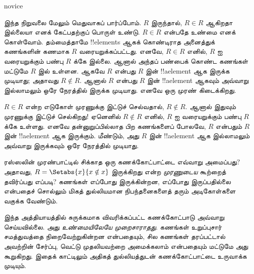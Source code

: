 \documentclass[../../../include/open-logic-section]{subfiles}
\begin{document}
\begin{tagblock}{novice}
\begin{explain}
இந்த நிறுவலை மேலும் மெதுவாகப் பார்ப்போம். $R$ இருந்தால்,
$R \in R$ ஆகிறதா இல்லையா எனக் கேட்பதற்குப் பொருள் உண்டு.
$R \in R$ என்பதே உண்மை எனக் கொள்வோம்.
தம்மைத்தாமே !!{element}s ஆகக் கொண்டிராத அனைத்துக் கணங்களின் கணமாக
$R$ வரையறுக்கப்பட்டது. எனவே, $R \in R$ எனில்,
$R$ ஐ வரையறுக்கும் பண்பு $R$ க்கே இல்லை.
ஆனால் அந்தப் பண்பைக் கொண்ட கணங்கள் மட்டுமே $R$ இல் உள்ளன.
ஆகவே $R$ என்பது $R$ இன் !!a{element} ஆக இருக்க முடியாது;
அதாவது $R \notin R$. ஆனால் $R$ என்பது $R$ இன் !!a{element} ஆகவும்
அவ்வாறு இல்லாமலும் ஒரே நேரத்தில் இருக்க முடியாது.
எனவே ஒரு முரண் கிடைக்கிறது.

$R \in R$ என்ற எடுகோள் முரணுக்கு இட்டுச் செல்வதால், $R \notin R$.
ஆனால் இதுவும் முரணுக்கு இட்டுச் செல்கிறது!
ஏனெனில் $R \notin R$ எனில், $R$ ஐ வரையறுக்கும் பண்பு $R$ க்கே உள்ளது.
எனவே தன்னுறுப்பில்லாத பிற கணங்களைப் போலவே, $R$ என்பதும் $R$ இன்
!!a{element} ஆக இருக்கும். மீண்டும், அது $R$ இன் !!a{element} ஆக இல்லாமலும்
அவ்வாறு இருக்கவும் ஒரே நேரத்தில் முடியாது.
\end{explain}
\end{tagblock}

\begin{digress}
ரஸ்ஸலின் முரண்பாட்டில் சிக்காத ஒரு கணக்கோட்பாட்டை எவ்வாறு அமைப்பது?
அதாவது, $R = \Setabs{x}{x \notin x}$ இருக்கிறது என்ற
\emph{முரணுடைய} கூற்றைத் தவிர்ப்பது எப்படி?
கணங்கள் எப்போது இருக்கின்றன, எப்போது இருப்பதில்லை என்பதைச் சொல்லும்
மிகத் துல்லியமான நிபந்தனைகளைத் தரும் அடிகோள்களை வகுக்க வேண்டும்.

இந்த அத்தியாயத்தில் சுருக்கமாக விவரிக்கப்பட்ட கணக்கோட்பாடு அவ்வாறு செய்யவில்லை.
அது \emph{உண்மையிலேயே முறைசாராதது}.
கணங்கள் உறுப்புசார் சமத்துவத்தை நிறைவேற்றுகின்றன என்பதையும்,
சில கணங்கள் தரப்பட்டால் அவற்றின் சேர்ப்பு, வெட்டு முதலியவற்றை
அமைக்கலாம் என்பதையும் மட்டுமே அது கூறுகிறது.
இதைக் காட்டிலும் அதிகத் துல்லியத்துடன் கணக்கோட்பாட்டை உருவாக்க முடியும்.
\end{digress}
\end{document}
